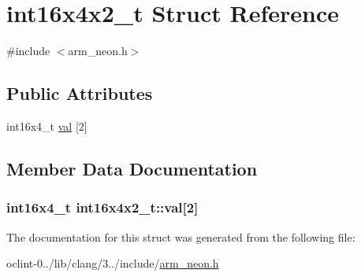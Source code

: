 \hypertarget{structint16x4x2__t}{\section{int16x4x2\-\_\-t Struct Reference}
\label{structint16x4x2__t}
}


{\ttfamily \#include $<$arm\-\_\-neon.\-h$>$}

\subsection*{Public Attributes}
\begin{DoxyCompactItemize}
\item 
int16x4\-\_\-t \hyperlink{structint16x4x2__t_a364d92d220766b0495e9bdbcd85d56f7}{val} \mbox{[}2\mbox{]}
\end{DoxyCompactItemize}


\subsection{Member Data Documentation}
\hypertarget{structint16x4x2__t_a364d92d220766b0495e9bdbcd85d56f7}{
\subsubsection[{val}]{\setlength{\rightskip}{0pt plus 5cm}int16x4\-\_\-t int16x4x2\-\_\-t\-::val\mbox{[}2\mbox{]}}}\label{structint16x4x2__t_a364d92d220766b0495e9bdbcd85d56f7}


The documentation for this struct was generated from the following file\-:\begin{DoxyCompactItemize}
\item 
oclint-\/0../lib/clang/3../include/\hyperlink{arm__neon_8h}{arm\-\_\-neon.\-h}\end{DoxyCompactItemize}
